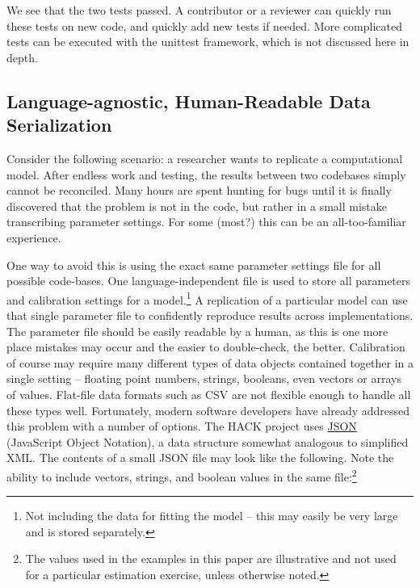 \documentclass[]{article}
\begin{document}
We see that the two tests passed. A contributor or a reviewer can
quickly run these tests on new code, and quickly add new tests if
needed. More complicated tests can be executed with the unittest
framework, which is not discussed here in depth.

\subsection{Language-agnostic, Human-Readable Data
Serialization}\label{language-agnostic-human-readable-data-serialization}

Consider the following scenario: a researcher wants to replicate a
computational model. After endless work and testing, the results between
two codebases simply cannot be reconciled. Many hours are spent hunting
for bugs until it is finally discovered that the problem is not in the
code, but rather in a small mistake transcribing parameter settings. For
some (most?) this can be an all-too-familiar experience.

One way to avoid this is using the exact same parameter settings file
for all possible code-bases. One language-independent file is used to
store all parameters and calibration settings for a model.\footnote{Not
  including the data for fitting the model -- this may easily be very
  large and is stored separately.} A replication of a particular model
can use that single parameter file to confidently reproduce results
across implementations. The parameter file should be easily readable by
a human, as this is one more place mistakes may occur and the easier to
double-check, the better. Calibration of course may require many
different types of data objects contained together in a single setting
-- floating point numbers, strings, booleans, even vectors or arrays of
values. Flat-file data formats such as CSV are not flexible enough to
handle all these types well. Fortunately, modern software developers
have already addressed this problem with a number of options. The HACK
project uses \href{http://json.org/}{JSON} (JavaScript Object Notation),
a data structure somewhat analogous to simplified XML. The contents of a
small JSON file may look like the following. Note the ability to include
vectors, strings, and boolean values in the same file:\footnote{The
  values used in the examples in this paper are illustrative and not
  used for a particular estimation exercise, unless otherwise noted.}
\end{document}
